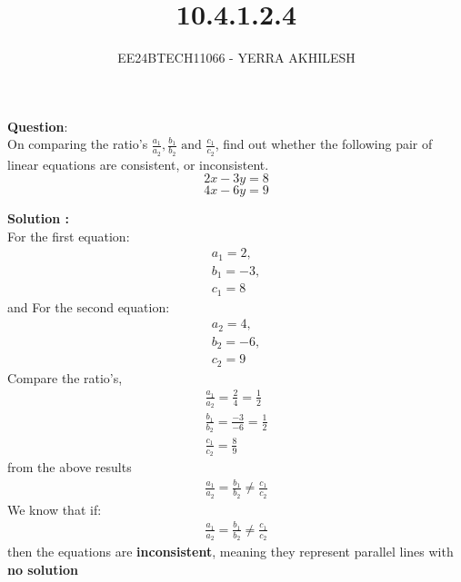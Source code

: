 \documentclass[journal]{IEEEtran}
\begin{document}

\vspace{3cm}

\title{10.4.1.2.4}
\author{EE24BTECH11066 - YERRA AKHILESH}
{\let\newpage\relax\maketitle}

\renewcommand{\thefigure}{\theenumi}
\renewcommand{\thetable}{\theenumi}
\setlength{\intextsep}{10pt} %

\renewcommand{\thetable}{\theenumi}
\textbf{Question}:\\

On comparing the ratio's $\frac{a_1}{a_2}, \frac{b_1}{b_2} \text{ and } \frac{c_1}{c_2}$, find out whether the following pair of linear equations are consistent, or inconsistent.\\
$$2x - 3y = 8 $$
$$4x - 6y = 9$$

\textbf{Solution : }\\

For the first equation:
\begin{align}
    a_1 = 2,\\ b_1 = -3,\\ c_1 = 8
\end{align}
and For the second equation:
\begin{align}
    a_2 = 4,\\ b_2 = -6,\\ c_2 = 9
\end{align}
Compare the ratio's,
\begin{align}
    \frac{a_1}{a_2} = \frac{2}{4} = \frac{1}{2}\\
    \frac{b_1}{b_2} = \frac{-3}{-6} = \frac{1}{2}\\
    \frac{c_1}{c_2} = \frac{8}{9}
\end{align}
from the above results
\begin{align}
    \frac{a_1}{a_2} =\frac{b_1}{b_2} \neq \frac{c_1}{c_2}
\end{align}
We know that if:
\begin{align}
    \frac{a_1}{a_2} =\frac{b_1}{b_2} \neq \frac{c_1}{c_2}
\end{align}
then the equations are \textbf{inconsistent}, meaning they represent parallel lines with \textbf{no solution}
\end{document}
